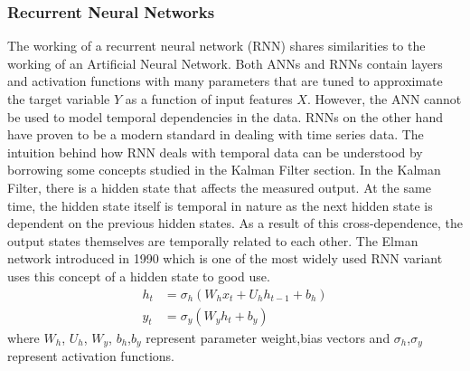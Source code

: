 \documentclass{article}
\begin{document}
\subsubsection{Recurrent Neural Networks}
The working of a recurrent neural network (RNN) shares similarities to the working of an Artificial Neural Network. Both ANNs and RNNs contain layers and activation functions with many parameters that are tuned to approximate the target variable $Y$ as a function of input features $X$. However, the ANN cannot be used to model temporal dependencies in the data. RNNs on the other hand have proven to be a modern standard in dealing with time series data. The intuition behind how RNN deals with temporal data can be understood by borrowing some concepts studied in the Kalman Filter section. In the Kalman Filter, there is a hidden state that affects the measured output. At the same time, the hidden state itself is temporal in nature as the next hidden state is dependent on the previous hidden states. As a result of this cross-dependence, the output states themselves are temporally related to each other. The Elman network \cite{miikkulainen_simple_2010} introduced in 1990 which is one of the most widely used RNN variant uses this concept of a hidden state to good use. 
\begin{equation}
\begin{split}
    h_t&=\sigma_h(W_hx_t+U_{h}h_{t-1}+b_h)\\
    y_t&=\sigma_y(W_yh_t+b_y)
\end{split}
\end{equation}
where $W_h$, $U_h$, $W_y$, $b_h$,$b_y$ represent parameter weight,bias vectors and $\sigma_h$,$\sigma_y$ represent activation functions. 
\end{document}
